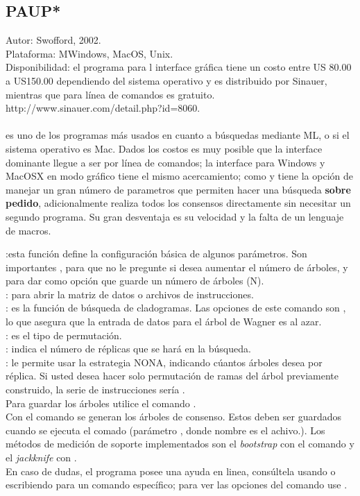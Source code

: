 \subsection{PAUP*}
\noindent
Autor: Swofford, 2002.\\
Plataforma: MWindows, MacOS, Unix.\\
Disponibilidad: el programa para l interface gr\'afica tiene un costo entre US 80.00 a US150.00 dependiendo del sistema operativo y es distribuido por Sinauer, mientras que para l\'inea de comandos es gratuito.\\
http://www.sinauer.com/detail.php?id=8060.


\paragraph*{}
 es uno de los programas m\'as usados en cuanto a b\'usquedas mediante ML, o si el sistema operativo es Mac. Dados los costos es muy posible que la interface dominante llegue a ser por l\'inea de comandos; la interface para Windows y MacOSX en modo gr\'afico tiene el mismo acercamiento; como  y  tiene la opci\'on de manejar un gran n\'umero de parametros que permiten hacer una b\'usqueda \textbf{sobre pedido}, adicionalmente realiza todos los consensos directamente sin necesitar un segundo programa. Su gran desventaja es su velocidad y la falta de un lenguaje de macros.


:esta funci\'on define la configuraci\'on b\'asica de algunos par\'ametros. Son importantes , para que no le pregunte si desea aumentar el n\'umero de \'arboles, y  para dar como opci\'on que guarde un n\'umero de \'arboles (N).\\
: para abrir la matriz de datos o archivos de instrucciones.\\
: es la funci\'on de b\'usqueda de cladogramas. Las opciones de este comando son , lo que asegura que la entrada de datos para el \'arbol de Wagner es al azar.\\
: es el tipo de permutaci\'on.\\
: indica el n\'umero de r\'eplicas que se har\'a en la b\'usqueda.\\ 
: le permite usar la estrategia NONA, indicando c\'uantos \'arboles desea por r\'eplica. Si usted desea hacer solo permutaci\'on de ramas del \'arbol previamente construido, la serie de instrucciones ser\'ia .\\
Para guardar los \'arboles utilice el comando .\\
Con el comando  se generan los \'arboles de consenso. Estos deben ser guardados cuando se ejecuta el comado (par\'ametro , donde nombre es el achivo.). Los m\'etodos de medici\'on de soporte implementados son el \textit{bootstrap} con el comando  y el \textit{jackknife} con .\\
En caso de dudas, el programa posee una ayuda en linea, cons\'ultela usando  o escribiendo  para un comando espec\'ifico; para ver las opciones del comando use .